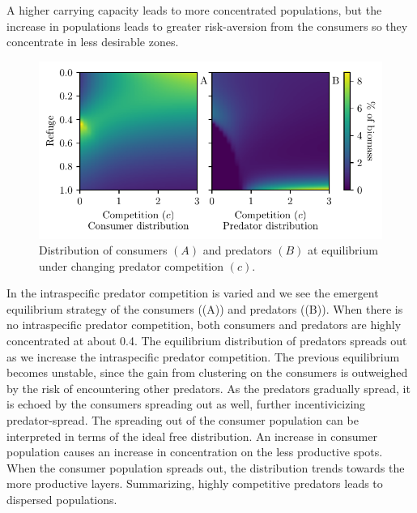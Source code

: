 A higher carrying capacity leads to more concentrated populations, but the increase in populations leads to greater risk-aversion from the consumers so they concentrate in less desirable zones.

\begin{figure}[H]
  \caption{Distribution of consumers $(A)$ and predators $(B)$ at equilibrium under changing predator competition $(c)$.}
  \label{fig:strat_comp}
    \includegraphics{plots/increasing_competition_c.pdf}
\end{figure}
In  the intraspecific predator competition is varied and we see the emergent  equilibrium strategy of the consumers ((A)) and predators ((B)). When there is no intraspecific predator competition, both consumers and predators are highly concentrated at about 0.4. The equilibrium distribution of predators spreads out as we increase the intraspecific predator competition. The previous equilibrium becomes unstable, since the gain from clustering on the consumers is outweighed by the risk of encountering other predators. As the predators gradually spread, it is echoed by the consumers spreading out as well, further incentivicizing predator-spread. The spreading out of the consumer population can be interpreted in terms of the ideal free distribution. An increase in consumer population  causes an increase in concentration on the less productive spots. When the consumer population spreads out,  the distribution trends towards the more productive layers. Summarizing, highly competitive predators leads to dispersed populations.
